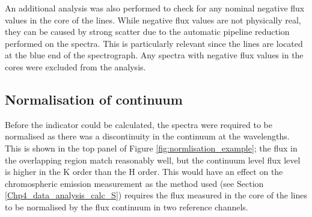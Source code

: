 An additional analysis was also performed to check for any nominal negative flux values in the core of the \caII lines. While negative flux values are not physically real, they can be caused by strong scatter due to the automatic pipeline reduction performed on the spectra. This is particularly relevant since the \caII lines are located at the blue end of the spectrograph. Any spectra with negative flux values in the \caII cores were excluded from the analysis.

\subsection{Normalisation of continuum}
\label{Chp4_data_analysis_normalise_cont}
Before the \Rprime indicator could be calculated, the spectra were required to be normalised as there was a discontinuity in the continuum at the \caII wavelengths. This is shown in the top panel of Figure \ref{fig:normlisation_example}; the flux in the overlapping region match reasonably well, but the continuum level flux level is higher in the K order than the H order. This would have an effect on the chromospheric emission measurement as the method used (see Section \ref{Chp4_data_analysis_calc_S}) requires the flux measured in the core of the \caII lines to be normalised by the flux continuum in two reference channels.

